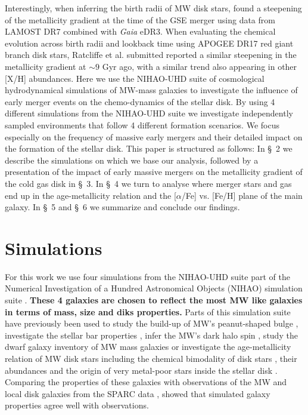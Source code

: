 \documentclass[useAMS,usenatbib]{mnras}
\begin{document}
Interestingly, when inferring the birth radii of MW disk stars, \citet{Lu2022b} found a steepening of the metallicity gradient at the time of the GSE merger using data from LAMOST DR7 combined with {\it Gaia} eDR3. When evaluating the chemical evolution across birth radii and lookback time using APOGEE DR17 red giant branch disk stars, Ratcliffe et al. submitted reported a similar steepening in the metallicity gradient at $\sim9$ Gyr ago, with a similar trend also appearing in other [X/H] abundances. Here we use the NIHAO-UHD suite of cosmological hydrodynamical simulations of MW-mass galaxies \citep{Buck2020a} to investigate the influence of early merger events on the chemo-dynamics of the stellar disk. By using 4 different simulations from the NIHAO-UHD suite we investigate independently sampled environments that follow 4 different formation scenarios. We focus especially on the frequency of massive early mergers and their detailed impact on the formation of the stellar disk. This paper is structured as follows: In \S~2 we describe the simulations on which we base our analysis, followed by a presentation of the impact of early massive mergers on the metallicity gradient of the cold gas disk in \S~3. In \S~4 we turn to analyse where merger stars and gas end up in the age-metallicity relation  and the [$\alpha$/Fe] vs. [Fe/H] plane of the main galaxy. In \S~5 and \S~6 we summarize and conclude our findings.


\section{Simulations} \label{sec:simulation}

For this work we use four simulations from the NIHAO-UHD suite \citep{Buck2020a} part of the Numerical Investigation of a Hundred Astronomical Objects (NIHAO) simulation suite \citep{Wang2015}. \textbf{These 4 galaxies are chosen to reflect the most MW like galaxies in terms of mass, size and diks properties.} Parts of this simulation suite have previously been used to study the build-up of MW's peanut-shaped bulge \citep{Buck2018,Buck2019b}, investigate the stellar bar properties \citep{Hilmi2020}, infer the MW's dark halo spin \citep{Obreja2022}, study the dwarf galaxy inventory of MW mass galaxies \citep{Buck2019} or investigate the age-metallicity relation of MW disk stars \citep{Lu2022} including the chemical bimodality of disk stars \citep{Buck2020}, their abundances \citep{Lu2022a} and the origin of very metal-poor stars inside the stellar disk \citep{Sestito2021}.
Comparing the properties of these galaxies with observations of the MW and local disk galaxies from the SPARC data \citep{Lelli2016}, \citet{Buck2020a} showed that simulated galaxy properties agree well with observations.
\end{document}

